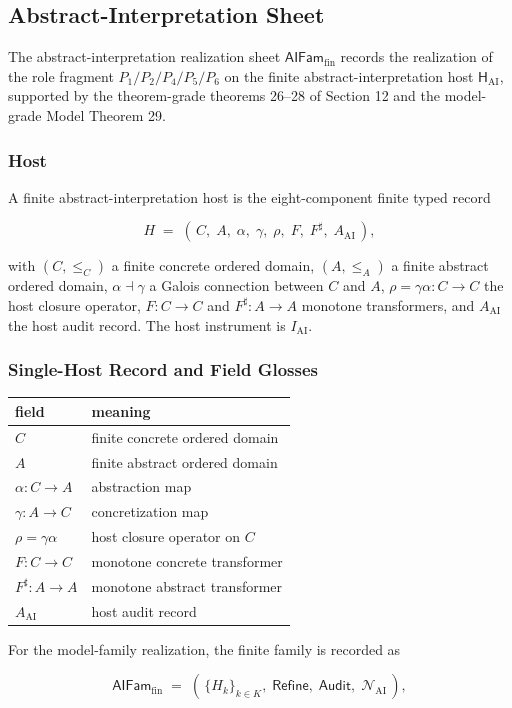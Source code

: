 \documentclass[11pt]{article}
\theoremstyle{definition}
\begin{document}
\subsection{Abstract-Interpretation Sheet}

The abstract-interpretation realization sheet \(\mathsf{AIFam}_{\mathrm{fin}}\) records the realization of the role fragment \(P_{1}/P_{2}/P_{4}/P_{5}/P_{6}\) on the finite abstract-interpretation host \(\mathsf H_{\mathrm{AI}}\), supported by the theorem-grade theorems 26--28 of Section 12 and the model-grade Model Theorem 29.

\subsubsection{Host}

A finite abstract-interpretation host is the eight-component finite typed record

\[
H\;=\;(\,C,\;A,\;\alpha,\;\gamma,\;\rho,\;F,\;F^{\sharp},\;A_{\mathrm{AI}}\,),
\]

with \((C,\le_{C})\) a finite concrete ordered domain, \((A,\le_{A})\) a finite abstract ordered domain, \(\alpha\dashv\gamma\) a Galois connection between \(C\) and \(A\), \(\rho=\gamma\alpha:C\to C\) the host closure operator, \(F:C\to C\) and \(F^{\sharp}:A\to A\) monotone transformers, and \(A_{\mathrm{AI}}\) the host audit record. The host instrument is \(I_{\mathrm{AI}}\).

\subsubsection{Single-Host Record and Field Glosses}

\begin{longtable}[]{@{}ll@{}}
\toprule
field & meaning\tabularnewline
\midrule
\endhead
\(C\) & finite concrete ordered domain\tabularnewline
\(A\) & finite abstract ordered domain\tabularnewline
\(\alpha:C\to A\) & abstraction map\tabularnewline
\(\gamma:A\to C\) & concretization map\tabularnewline
\(\rho=\gamma\alpha\) & host closure operator on \(C\)\tabularnewline
\(F:C\to C\) & monotone concrete transformer\tabularnewline
\(F^{\sharp}:A\to A\) & monotone abstract transformer\tabularnewline
\(A_{\mathrm{AI}}\) & host audit record\tabularnewline
\bottomrule
\end{longtable}

For the model-family realization, the finite family is recorded as

\[
\mathsf{AIFam}_{\mathrm{fin}}\;=\;(\,\{H_k\}_{k\in K},\;\mathsf{Refine},\;\mathsf{Audit},\;\mathcal N_{\mathrm{AI}}\,),
\]
\end{document}
